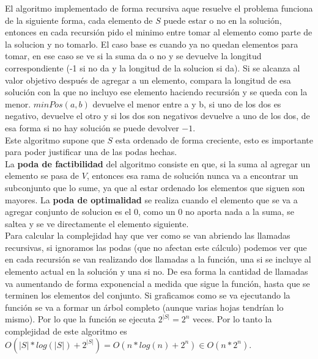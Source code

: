 \documentclass[a4paper]{article}
\begin{document}
El algoritmo implementado de forma recursiva aque resuelve el problema funciona de la siguiente forma, cada elemento de $S$ puede estar o no en la solución, entonces en cada recursión pido el minimo entre tomar al elemento como parte de la solucion y no tomarlo. El caso base es cuando ya no quedan elementos para tomar, en ese caso se ve si la suma da o no y se devuelve la longitud correspondiente (-1 si no da y la longitud de la solucion si da). Si se alcanza al valor objetivo después de agregar a un elemento, compara la longitud de esa solución con la que no incluyo ese elemento haciendo recursión y se queda con la menor. $minPos(a, b)$ devuelve el menor entre a y b, si uno de los dos es negativo, devuelve el otro y si los dos son negativos devuelve a uno de los dos, de esa forma si no hay solución se puede devolver $-1$.
\\
Este algoritmo supone que $S$ esta ordenado de forma creciente, esto es importante para poder justificar una de las podas hechas.
\\

La \textbf{poda de factibilidad} del algoritmo consiste en que, si la suma al agregar un elemento se pasa de $V$, entonces esa rama de solución nunca va a encontrar un subconjunto que lo sume, ya que al estar ordenado los elementos que siguen son mayores. La \textbf{poda de optimalidad} se realiza cuando el elemento que se va a agregar conjunto de solucion es el 0, como un 0 no aporta nada a la suma, se saltea y se ve directamente el elemento siguiente.
\\

Para calcular la complejidad hay que ver como se van abriendo las llamadas recursivas, si ignoramos las podas (que no afectan este cálculo) podemos ver que en cada recursión se van realizando dos llamadas a la función, una si se incluye al elemento actual en la solución y una si no. De esa forma la cantidad de llamadas va aumentando de forma exponencial a medida que sigue la función, hasta que se terminen los elementos del conjunto. Si graficamos como se va ejecutando la función se va a formar un árbol completo (aunque varias hojas tendrían lo mismo). Por lo que la función se ejecuta $2^{|S|} = 2^n$ veces.
Por lo tanto la complejidad de este algoritmo es $O(|S|*log(|S|) + 2^|S|) = O(n*log(n) + 2^n) \in O(n*2^n)$.
 
\end{document}
